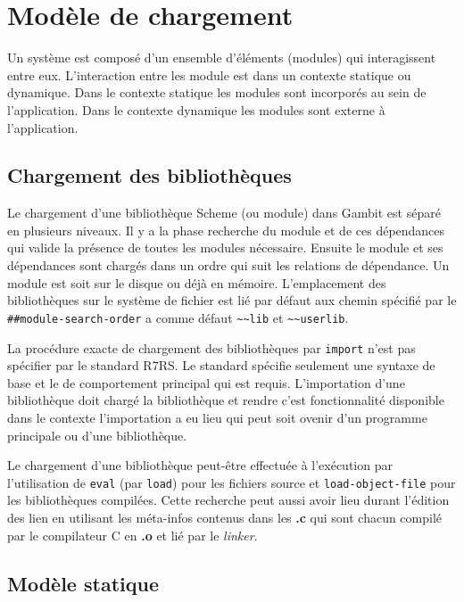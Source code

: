 
\chapter{Modèle de chargement}
\label{ch:loading-model}

Un système est composé d'un ensemble d'éléments (modules) qui interagissent
entre eux. L'interaction entre les module est dans un contexte statique ou
dynamique. Dans le contexte statique les modules sont incorporés au sein de
l'application. Dans le contexte dynamique les modules sont externe à
l'application.

\section{Chargement des bibliothèques}


Le chargement d'une bibliothèque Scheme (ou module) dans Gambit est séparé en
plusieurs niveaux. Il y a la phase recherche du module et de ces dépendances
qui valide la présence de toutes les modules nécessaire.  Ensuite le module et
ses dépendances sont chargés dans un ordre qui suit les relations de
dépendance.  Un module est soit sur le disque ou déjà en mémoire.
L'emplacement des bibliothèques sur le système de fichier est lié par défaut
aux chemin spécifié par le \lstinline{##module-search-order} a comme défaut
\lstinline{~~lib} et \lstinline{~~userlib}.

La procédure exacte de chargement des bibliothèques par \verb|import| n'est pas
spécifier par le standard R7RS. Le standard spécifie seulement une syntaxe de
base et le de comportement principal qui est requis. L'importation d'une
bibliothèque doit chargé la bibliothèque et rendre c'est fonctionnalité
disponible dans le contexte l'importation a eu lieu qui peut soit ovenir d'un
programme principale ou d'une bibliothèque.

Le chargement d'une bibliothèque peut-être effectuée à l'exécution par
l'utilisation de \texttt{eval} (par \texttt{load}) pour les fichiers source et
\texttt{load-object-file} pour les bibliothèques compilées. Cette recherche
peut aussi avoir lieu durant l'édition des lien en utilisant les méta-infos
contenus dans les \textbf{.c} qui sont chacun compilé par le compilateur C
en \textbf{.o} et lié par le \textit{linker}.
\section{Modèle statique}

